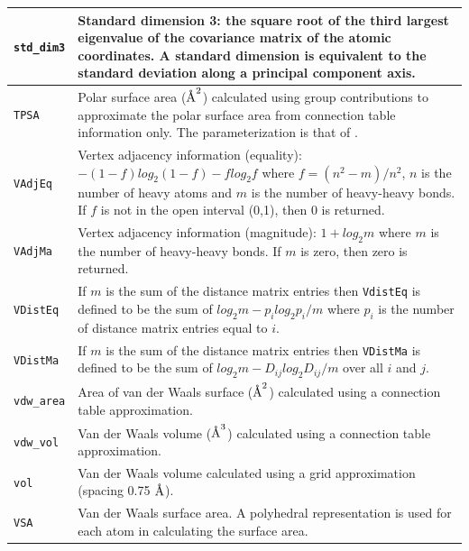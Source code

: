 \documentclass[12pt,a4paper]{article}
\newcommand{\angstrom}{\mbox{\normalfont\AA}}
\begin{document}
\begin{longtable}{@{\zz}|p{}|p{}|}
\texttt{std\_dim3} & Standard dimension 3: the square root of the third 
largest eigenvalue of the covariance matrix of the atomic coordinates. 
A standard dimension is equivalent to the standard deviation along a 
principal component axis.\\ \hline

\texttt{TPSA} & Polar surface area ($\angstrom^2$) calculated using 
group contributions to approximate the polar surface area from connection 
table information only. The parameterization is that of \cite{Ertl2000}.\\ \hline

\texttt{VAdjEq} & Vertex adjacency information (equality): 
$-(1-f)log_2(1-f) - flog_2f$ where $f = (n^2 - m)/n^2$, $n$ is the number 
of heavy atoms and $m$ is the number of heavy-heavy bonds. If $f$ is not 
in the open interval (0,1), then 0 is returned.\\ \hline

\texttt{VAdjMa} & Vertex adjacency information (magnitude): $1 + log_2m$ 
where $m$ is the number of heavy-heavy bonds. If $m$ is zero, then zero 
is returned.\\ \hline

\texttt{VDistEq} & If $m$ is the sum of the distance matrix entries then 
\texttt{VdistEq} is defined to be the sum of $log_2m - p_i log_2p_i/m$ 
where $p_i$ is the number of distance matrix entries equal to $i$.\\ \hline

\texttt{VDistMa} & If $m$ is the sum of the distance matrix entries then 
\texttt{VDistMa} is defined to be the sum of $log_2m - D_{ij} log_2D_{ij}/m$ 
over all $i$ and $j$.\\ \hline

\texttt{vdw\_area} & Area of van der Waals surface ($\angstrom^2$) calculated 
using a connection table approximation.\\ \hline

\texttt{vdw\_vol} & Van der Waals volume ($\angstrom^3$) calculated using a 
connection table approximation.\\ \hline

\texttt{vol} & Van der Waals volume calculated using a grid approximation 
(spacing 0.75 $\angstrom$).\\ \hline

\texttt{VSA} & Van der Waals surface area. A polyhedral representation is 
used for each atom in calculating the surface area.\\ \hline


\end{longtable}
\end{document}
